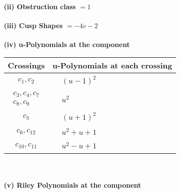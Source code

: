 \documentclass[1p]{elsarticle_modified}
\theoremstyle{definition}
\begin{document}
\flushleft \textbf{(ii) Obstruction class $= 1$}\\~\\
\flushleft \textbf{(iii) Cusp Shapes $= -4 v-2$}\\~\\
\newpage\renewcommand{\arraystretch}{1}
\flushleft \textbf{(iv) u-Polynomials at the component}\newline \\
\begin{tabular}{m{50pt}|m{274pt}}
Crossings & \hspace{64pt}u-Polynomials at each crossing \\
\hline $$\begin{aligned}c_{1},c_{2}\end{aligned}$$&$\begin{aligned}
&(u-1)^2
\end{aligned}$\\
\hline $$\begin{aligned}c_{3},c_{4},c_{7}\\c_{8},c_{9}\end{aligned}$$&$\begin{aligned}
&u^2
\end{aligned}$\\
\hline $$\begin{aligned}c_{5}\end{aligned}$$&$\begin{aligned}
&(u+1)^2
\end{aligned}$\\
\hline $$\begin{aligned}c_{6},c_{12}\end{aligned}$$&$\begin{aligned}
&u^2+u+1
\end{aligned}$\\
\hline $$\begin{aligned}c_{10},c_{11}\end{aligned}$$&$\begin{aligned}
&u^2- u+1
\end{aligned}$\\
\hline
\end{tabular}\\~\\
\newpage\renewcommand{\arraystretch}{1}
\flushleft \textbf{(v) Riley Polynomials at the component}\newline \\
\end{document}
